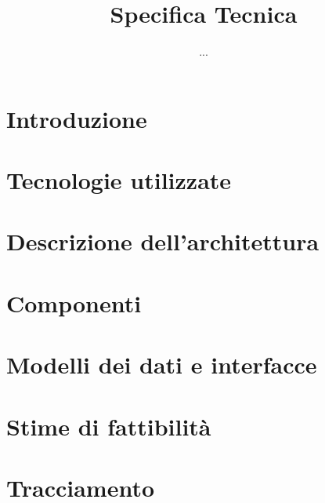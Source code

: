 


\author{...}
\dest{\ALL}
\title{Specifica Tecnica}


\maketitle

\tableofcontents
\newpage



\section{Introduzione}


\section{Tecnologie utilizzate}


\section{Descrizione dell'architettura}


\section{Componenti}


\section{Modelli dei dati e interfacce}


\section{Stime di fattibilità}


\section{Tracciamento}





